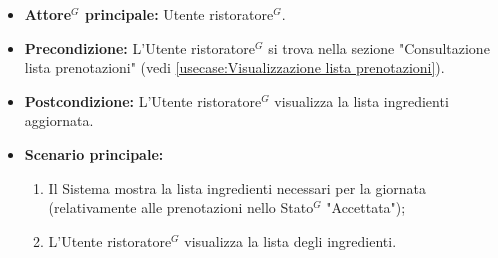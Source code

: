 \label{usecase:Consultazione lista ingredienti}
\begin{itemize}

	\item \textbf{\gls{Attore}$^G$ principale:} \gls{Utente ristoratore}$^G$.

	\item \textbf{Precondizione:} L'\gls{Utente ristoratore}$^G$ si trova nella sezione "Consultazione lista prenotazioni" (vedi \autoref{usecase:Visualizzazione lista prenotazioni}).

	\item \textbf{Postcondizione:} L'\gls{Utente ristoratore}$^G$ visualizza la lista ingredienti aggiornata.

	\item \textbf{Scenario principale:}
	      \begin{enumerate}
		      \item Il Sistema mostra la lista ingredienti necessari per la giornata (relativamente alle prenotazioni nello \gls{Stato}$^G$ "Accettata");
		      \item L'\gls{Utente ristoratore}$^G$ visualizza la lista degli ingredienti.
	      \end{enumerate}

\end{itemize}

